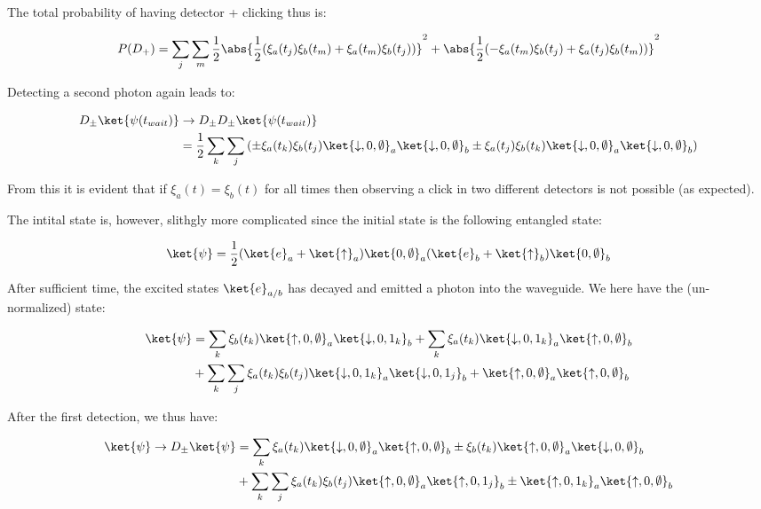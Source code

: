 The total probability of having detector + clicking thus is:

\begin{equation}
    P(D_+) =  \sum_j \sum_m \frac{1}{2} \abs{\frac{1}{2} ( \xi_a(t_j)\xi_b(t_m) + \xi_a(t_m)\xi_b(t_j))}^2 + \abs{ \frac{1}{2} ( -\xi_a(t_m) \xi_b(t_j) +\xi_a(t_j) \xi_b(t_m))}^2
\end{equation}


Detecting a second photon again leads to:

\begin{align}
    D_\pm \ket{\psi(t_{wait})} &\rightarrow D_\pm D_\pm \ket{\psi(t_{wait})} \\
    & = \frac{1}{2} \sum_k \sum_j \left( \pm \xi_a(t_k)\xi_b(t_j)  \ket{\downarrow, 0, \emptyset}_a \ket{\downarrow,0,\emptyset}_b \pm \xi_a(t_j)\xi_b(t_k) \ket{\downarrow,0,\emptyset}_a \ket{\downarrow,0,\emptyset}_b \right )   
\end{align}

From this it is evident that if $\xi_a(t)=\xi_b(t)$ for all times then observing a click in two different detectors is not possible (as expected). 

The intital state is, however, slithgly more complicated since the initial state is the following entangled state:

\begin{equation}
    \ket{\psi} = \frac{1}{2}(\ket{e}_a+\ket{\uparrow}_a)\ket{0,\emptyset}_a(\ket{e}_b+\ket{\uparrow}_b)\ket{0,\emptyset}_b
\end{equation}

After sufficient time, the excited states $\ket{e}_{a/b}$ has decayed and emitted a photon into the waveguide. We here have the (un-normalized) state:

\begin{align}
    \ket{\psi} &= \sum_k  \xi_b(t_k) \ket{\uparrow,0,\emptyset}_a \ket{\downarrow,0,1_k}_b + \sum_k \xi_a(t_k) \ket{\downarrow,0,1_k}_a \ket{\uparrow,0,\emptyset}_b \\
    & + \sum_k \sum_j \xi_a(t_k)\xi_b(t_j) \ket{\downarrow,0,1_k}_a\ket{\downarrow,0,1_j}_b + \ket{\uparrow,0,\emptyset}_a\ket{\uparrow,0,\emptyset}_b
\end{align}

After the first detection, we thus have:

\begin{align}
    \ket{\psi} \rightarrow D_\pm \ket{\psi} &=  \sum_k \xi_a(t_k) \ket{\downarrow,0,\emptyset}_a \ket{\uparrow,0,\emptyset}_b \pm \xi_b(t_k) \ket{\uparrow,0,\emptyset}_a \ket{\downarrow,0,\emptyset}_b \\
    &+ \sum_k \sum_j \xi_a(t_k)\xi_b(t_j) \ket{\uparrow,0,\emptyset}_a\ket{\uparrow,0,1_j}_b \pm \ket{\uparrow,0,1_k}_a\ket{\uparrow,0,\emptyset}_b 
\end{align}

